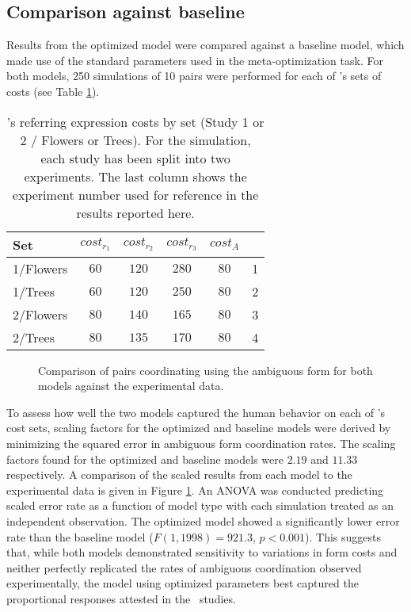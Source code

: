 \documentclass[a4paper,11pt]{article}
\begin{document}
\subsection{Comparison against baseline}
\label{sec:model_comparison}
Results from the optimized model were compared against a baseline model, which made use of the standard parameters used in the meta-optimization task. For both models, 250 simulations of 10 pairs were performed for each of \citeauthor{rohde2012}'s sets of costs (see Table \ref{table:2}).
\begin{table}[]
\begin{center}
    \begin{tabular}{l c c c c | c}
    Set & $cost_{r_1}$ & $cost_{r_2}$ & $cost_{r_3}$ & $cost_A$ & \\ \hline
    1/Flowers & $60$ & $120$ & $280$ & $80$ & 1\\ \hline
    1/Trees & $60$ & $120$ & $250$ & $80$ & 2\\ \hline
    2/Flowers & $80$ & $140$ & $165$ & $80$ & 3\\ \hline
    2/Trees & $80$ & $135$ & $170$ & $80$ & 4\\ 
    \end{tabular}
    \caption{\citeauthor{rohde2012}'s referring expression costs by set (Study 1 or 2 / Flowers or Trees). For the simulation, each study has  been split into two experiments. The last column shows the experiment number used for reference in the results reported here.}
    \label{table:2}
\end{center}
\end{table}

\begin{figure}[t]
\centering
\scalebox{.55}{}
\caption{Comparison of pairs coordinating using the ambiguous form for both models against the experimental data.}
\label{fig:model_comp}
\end{figure}

To assess how well the two models captured the human behavior on each of \citeauthor{rohde2012}'s cost sets, scaling factors for the optimized and baseline models were derived by minimizing the squared error in ambiguous form coordination rates. The scaling factors found for the optimized and baseline models were $2.19$ and $11.33$ respectively. A comparison of the scaled results from each model to the experimental data is given in Figure \ref{fig:model_comp}. An ANOVA was conducted predicting scaled error rate as a function of model type with each simulation treated as an independent observation. The optimized model showed a significantly lower error rate than the baseline model ($F(1, 1998) = 921.3$, $p<0.001$). This suggests that, while both models demonstrated sensitivity to variations in form costs and neither perfectly replicated the rates of ambiguous coordination observed experimentally, the model using optimized parameters best captured the proportional responses attested in the \citeauthor{rohde2012}\ studies. 
\end{document}
